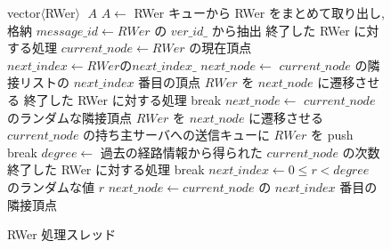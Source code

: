 \renewcommand{\algorithmicrequire}{\textbf{Input:}}
\renewcommand{\algorithmicensure}{\textbf{Output:}}
\begin{figure}[!t]
    \begin{algorithm}[H]
        \caption{RWer 処理スレッド}
        \label{RWer 処理スレッド}
        \begin{algorithmic}[1]   
        \STATE vector$\langle$RWer$\rangle$ $\; A$  
        \STATE $A \leftarrow$ RWer キューから RWer をまとめて取り出し, 格納
            \STATE $message\_id \leftarrow RWer$ の $ver\_id\_$ から抽出
                \STATE 終了した RWer に対する処理
                    \STATE $current\_node \leftarrow RWer$ の現在頂点
                            \STATE $next\_index \leftarrow RWer の next\_index\_$ 
                            \STATE $next\_node \leftarrow$ $current\_node$ の隣接リストの $next\_index$ 番目の頂点
                            \STATE $RWer$ を $next\_node$ に遷移させる
                            \STATE 終了した RWer に対する処理
                            \STATE break
                        \ELSE
                            \STATE $next\_node \leftarrow$ $current\_node$ のランダムな隣接頂点
                            \STATE $RWer$ を $next\_node$ に遷移させる
                        \ENDIF
                            \STATE $current\_node$ の持ち主サーバへの送信キューに $RWer$ を push
                            \STATE break
                        \ELSE
                            \STATE $degree \leftarrow$ 過去の経路情報から得られた $current\_node$ の次数
                                \STATE 終了した RWer に対する処理
                                \STATE break
                            \ELSE
                                \STATE $next\_index \leftarrow 0 \leq r < degree$ のランダムな値 $r$ 
                                \STATE $next\_node \leftarrow current\_node$ の $next\_index$ 番目の隣接頂点

\end{algorithmic}
\end{algorithm}
\end{figure}
